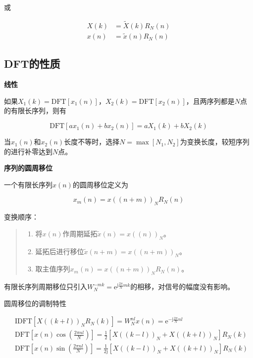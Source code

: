 \documentclass[cn, hazy, blue, normal, 14pt]{elegantnote}
\begin{document}
或

\begin{equation}
\begin{aligned}
    X(k)&=\widetilde{X}(k)R_N(n) \\
    x(n)&=\widetilde{x}(n)R_N(n)
\end{aligned}
\end{equation}

\subsection{DFT的性质}

\textbf{线性}

如果${X}_1(k)=\text{DFT}[{x}_1(n)]$，${X}_2(k)=\text{DFT}[{x}_2(n)]$，且两序列都是$N$点的有限长序列，则有

\begin{equation}
    \text{DFT}[a{x}_1(n)+b{x}_2(n)]=a{X}_1(k)+b{X}_2(k)
\end{equation}

当${x}_1(n)$和${x}_2(n)$长度不等时，选择$N=\max{[N_1, N_2]}$为变换长度，较短序列的进行补零达到$N$点。

\textbf{序列的圆周移位}

一个有限长序列$x(n)$的圆周移位定义为

\begin{equation}
    x_m(n)=x((n+m))_N R_N(n)
\end{equation}

变换顺序：

\begin{quote}
\begin{enumerate}
    \item 将$x(n)$作周期延拓$\widetilde{x}(n)=x((n))_N$。
    \item 延拓后进行移位$\widetilde{x}(n+m)=x((n+m))_N$。
    \item 取主值序列$x_m(n)=x((n+m))_N R_N(n)$。
\end{enumerate}
\end{quote}

有限长序列周期移位只引入$W_{N}^{-mk}=\text{e}^{\text{j}\frac{2\pi}{N}mk}$的相移，对信号的幅度没有影响。

圆周移位的调制特性

\begin{equation}
\begin{aligned}
    &\text{IDFT}[X((k+l))_N R_N(k)]=W_N^{nl}x(n)=\text{e}^{-\text{j}\frac{2\pi}{N}nl} \\
    &\text{DFT}[x(n)\cos(\frac{2\pi nl}{N})]=\frac{1}{2}[X((k-l))_N+X((k+l))_N]R_N(k) \\
    &\text{DFT}[x(n)\sin(\frac{2\pi nl}{N})]=\frac{1}{2\text{j}}[X((k-l))_N+X((k+l))_N]R_N(k)
\end{aligned}
\end{equation}
\end{document}

